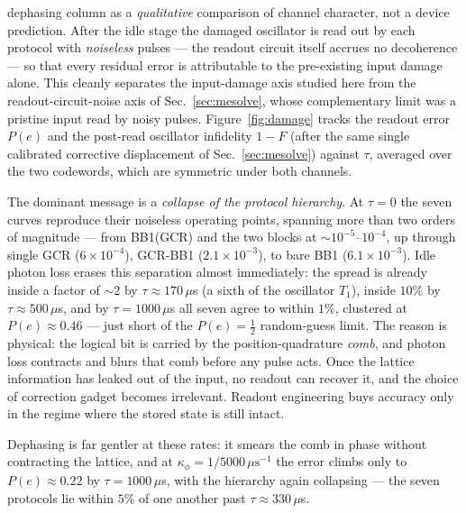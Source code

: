 \documentclass[11pt]{article}
\begin{document}
dephasing column as a \emph{qualitative} comparison of channel character, not a device
prediction. After the idle stage the damaged oscillator is read out by each protocol with
\emph{noiseless} pulses --- the readout circuit itself accrues no decoherence --- so that every
residual error is attributable to the pre-existing input damage alone. This cleanly separates
the input-damage axis studied here from the readout-circuit-noise axis of
Sec.~\ref{sec:mesolve}, whose complementary limit was a pristine input read by noisy pulses.
Figure~\ref{fig:damage} tracks the readout error $P(e)$ and the post-read oscillator infidelity
$1-F$ (after the same single calibrated corrective displacement of Sec.~\ref{sec:mesolve})
against $\tau$, averaged over the two codewords, which are symmetric under both channels.

The dominant message is a \emph{collapse of the protocol hierarchy}. At $\tau=0$ the seven
curves reproduce their noiseless operating points, spanning more than two orders of
magnitude --- from BB1(GCR) and the two blocks at $\sim\!10^{-5}$--$10^{-4}$, up through single
GCR ($6\times10^{-4}$), GCR-BB1 ($2.1\times10^{-3}$), to bare BB1 ($6.1\times10^{-3}$). Idle
photon loss erases this separation almost immediately: the spread is already inside a factor of
$\sim\!2$ by $\tau\approx170\,\mu$s (a sixth of the oscillator $T_1$), inside $10\%$ by
$\tau\approx500\,\mu$s, and by $\tau=1000\,\mu$s all seven agree to within $1\%$, clustered at
$P(e)\approx0.46$ --- just short of the $P(e)=\tfrac12$ random-guess limit. The reason is
physical: the logical bit is carried by the position-quadrature \emph{comb}, and photon loss
contracts and blurs that comb before any pulse acts. Once the lattice information has leaked out
of the input, no readout can recover it, and the choice of correction gadget becomes
irrelevant. Readout engineering buys accuracy only in the regime where the stored state is
still intact.

Dephasing is far gentler at these rates: it smears the comb in phase without contracting the
lattice, and at $\kappa_\phi=1/5000\,\mu\mathrm{s}^{-1}$ the error climbs only to
$P(e)\approx0.22$ by $\tau=1000\,\mu$s, with the hierarchy again collapsing --- the seven
protocols lie within $5\%$ of one another past $\tau\approx330\,\mu$s.
\end{document}
